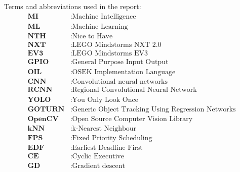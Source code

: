 
Terms and abbreviations used in the report:
\begin{align*}
    \textbf{MI} &: \text{Machine Intelligence} \\
    \textbf{ML} &: \text{Machine Learning} \\
    \textbf{NTH} &: \text{Nice to Have} \\
    \textbf{NXT} &: \text{LEGO Mindstorms NXT 2.0} \\
    \textbf{EV3} &: \text{LEGO Mindstorms EV3} \\  
    \textbf{GPIO} &: \text{General Purpose Input Output} \\
    \textbf{OIL} &: \text{OSEK Implementation Language} \\
    \textbf{CNN} &: \text{Convolutional neural networks} \\ 
    \textbf{RCNN} &: \text{Regional Convolutional Neural Network} \\ 
    \textbf{YOLO} &: \text{You Only Look Once} \\ 
    \textbf{GOTURN} &: \text{Generic Object Tracking Using Regression Networks} \\
    \textbf{OpenCV} &: \text{Open Source Computer Vision Library} \\
    \textbf{kNN} &: \text{k-Nearest Neighbour} \\
    \textbf{FPS} &: \text{Fixed Priority Scheduling} \\
    \textbf{EDF} &: \text{Earliest Deadline First} \\
    \textbf{CE} &: \text{Cyclic Executive} \\
    \textbf{GD} &: \text{Gradient descent} \\
\end{align*}
